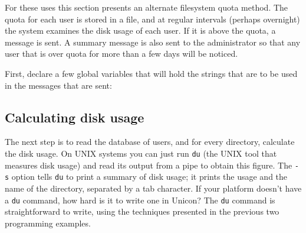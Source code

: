 For these uses this section presents an alternate filesystem quota
method. The quota for each user is stored in a file, and at regular
intervals (perhaps overnight) the system examines the disk usage of
each user. If it is above the quota, a message is sent. A summary
message is also sent to the administrator so that any user that is over
quota for more than a few days will be noticed.

First, declare a few global variables that will hold the strings that
are to be used in the messages that are sent:


\subsection*{Calculating disk usage}

The next step is to read the database of users, and for every
directory, calculate the disk usage. On
UNIX systems you can just run \texttt{du} (the UNIX tool that
measures disk usage) and read its output from a pipe to obtain this
figure. The \texttt{{}-s} option tells \texttt{du} to print a summary
of disk usage; it prints the usage and the name of the directory,
separated by a tab character. If your platform doesn't
have a \texttt{du} command, how hard is it to write one in Unicon? The
\texttt{du} command is straightforward to write, using
the techniques presented in the previous two programming examples.


